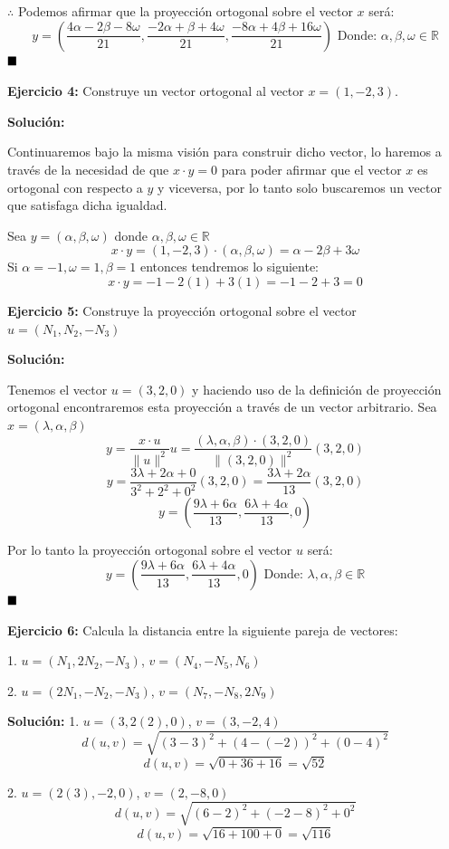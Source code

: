 \documentclass{article}
\begin{document}
$\therefore$ Podemos afirmar que la proyección ortogonal sobre el vector $x$ será: 
$$y = (\frac{4\alpha-2\beta-8\omega}{21}, \frac{-2\alpha+\beta+4\omega}{21}, \frac{-8\alpha+4\beta+16\omega}{21})\text{ Donde: } \alpha, \beta , \omega \in \mathbb{R}$$ 
$\hfill\blacksquare$
\vspace{10pt}

\textbf{Ejercicio 4: }Construye un vector ortogonal al vector $x = (1,-2,3)$.
\vspace{10pt}

\textbf{Solución:}
\vspace{10pt}

Continuaremos bajo la misma visión para construir dicho vector, lo haremos a través de la necesidad de que $x\cdot y = 0$ para poder afirmar que el vector $x$ es ortogonal con 
respecto a $y$ y viceversa, por lo tanto solo buscaremos un vector que satisfaga dicha igualdad.\par 
Sea $y = (\alpha , \beta, \omega)$ donde $\alpha, \beta , \omega \in \mathbb{R}$
$$x\cdot y =(1,-2,3) \cdot (\alpha , \beta, \omega) = \alpha-2\beta+3\omega$$
Si $\alpha = -1, \omega=1 , \beta= 1$ entonces tendremos lo siguiente:
$$x\cdot y = -1-2(1)+3(1) = -1-2+3 = 0$$

\textbf{Ejercicio 5: }Construye la proyección ortogonal sobre el vector $u = (N_1, N_2, -N_3)$
\vspace{10pt}

\textbf{Solución:}
\vspace{10pt}

Tenemos el vector $u = (3, 2, 0)$ y haciendo uso de la definición de proyección ortogonal encontraremos esta proyección a través de un vector arbitrario.
Sea $x =(\lambda, \alpha, \beta)$
$$y = \frac{x\cdot u}{\|u\|^2}u = \frac{(\lambda, \alpha, \beta) \cdot(3, 2, 0) }{\|(3, 2, 0)\|^2}(3, 2, 0)$$
$$y =\frac{3\lambda+2\alpha+ 0}{3^2 + 2^2 +0^2}(3, 2, 0) = \frac{3\lambda+2\alpha}{13}(3, 2, 0) $$
$$y = (\frac{9\lambda+6\alpha}{13}, \frac{6\lambda+4\alpha}{13}, 0)$$

Por lo tanto la proyección ortogonal sobre el vector $u$ será:
$$y = (\frac{9\lambda+6\alpha}{13}, \frac{6\lambda+4\alpha}{13}, 0) \text{  Donde: } \lambda, \alpha, \beta \in \mathbb{R}$$
$\hfill\blacksquare$
\vspace{10pt}

\textbf{Ejercicio 6:} Calcula la distancia entre la siguiente pareja de vectores: 


1. $u = (N_1, 2N_2, -N_3)$, $v = (N_4, -N_5, N_6)$

2. $u =(2N_1, -N_2, -N_3)$, $v = (N_7, -N_8, 2N_9)$
\vspace{10pt}

\textbf{Solución:}
\vspace{10pt}
1. $u = (3, 2(2), 0)$, $v = (3, -2, 4)$
$$d(u,v) = \sqrt{(3-3)^2+(4-(-2))^2+(0-4)^2}$$
$$d(u,v) = \sqrt{0+36+16} = \sqrt{52}$$

2. $u =(2(3), -2, 0)$, $v = (2, -8, 0)$
$$d(u,v) = \sqrt{(6-2)^2+(-2-8)^2+0^2}$$
$$d(u,v) = \sqrt{16+100+0} = \sqrt{116}$$


 
\end{document}
